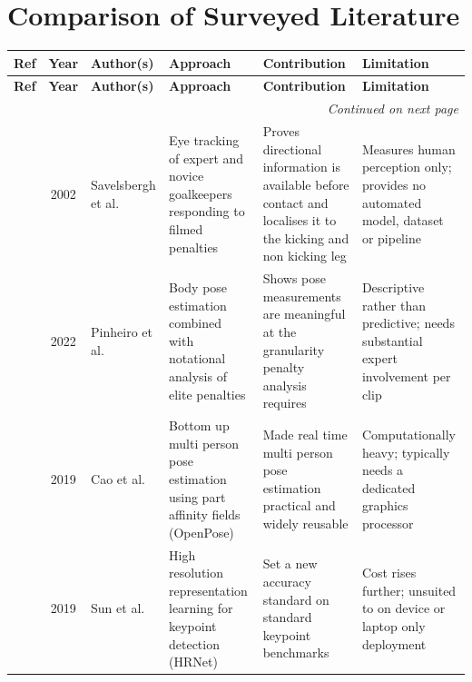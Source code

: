 \section{Comparison of Surveyed Literature}

\renewcommand{\arraystretch}{1.3}
\setlength{\tabcolsep}{4pt}
\small

\begin{longtable}{|c|c|>{\raggedright\arraybackslash}p{2.5cm}|
>{\raggedright\arraybackslash}p{2.9cm}|
>{\raggedright\arraybackslash}p{3.0cm}|
>{\raggedright\arraybackslash}p{3.0cm}|}

\hline
\textbf{Ref} & \textbf{Year} & \textbf{Author(s)} &
\textbf{Approach} & \textbf{Contribution} & \textbf{Limitation} \\
\hline
\endfirsthead

\hline
\textbf{Ref} & \textbf{Year} & \textbf{Author(s)} &
\textbf{Approach} & \textbf{Contribution} & \textbf{Limitation} \\
\hline
\endhead

\hline
\multicolumn{6}{r}{\textit{Continued on next page}} \\
\hline
\endfoot

\hline
\endlastfoot

\cite{savelsbergh2002} & 2002 & Savelsbergh et al. &
Eye tracking of expert and novice goalkeepers responding to filmed penalties &
Proves directional information is available before contact and localises it to the kicking and non kicking leg &
Measures human perception only; provides no automated model, dataset or pipeline \\ \hline

\cite{pinheiro2022} & 2022 & Pinheiro et al. &
Body pose estimation combined with notational analysis of elite penalties &
Shows pose measurements are meaningful at the granularity penalty analysis requires &
Descriptive rather than predictive; needs substantial expert involvement per clip \\ \hline

\cite{cao2019} & 2019 & Cao et al. &
Bottom up multi person pose estimation using part affinity fields (OpenPose) &
Made real time multi person pose estimation practical and widely reusable &
Computationally heavy; typically needs a dedicated graphics processor \\ \hline

\cite{sun2019} & 2019 & Sun et al. &
High resolution representation learning for keypoint detection (HRNet) &
Set a new accuracy standard on standard keypoint benchmarks &
Cost rises further; unsuited to on device or laptop only deployment \\ \hline


\end{longtable}
